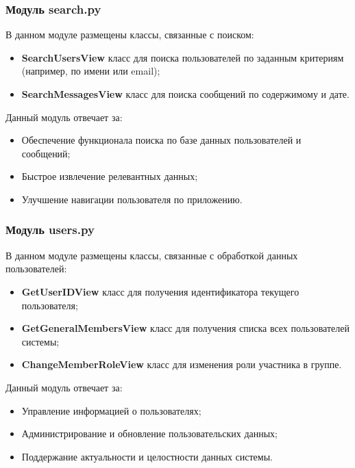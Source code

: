 \subsubsection{Модуль search.py}
В данном модуле размещены классы, связанные с поиском:
\begin{itemize}
	\item \textbf{SearchUsersView} класс для поиска пользователей по заданным критериям (например, по имени или email);
	\item \textbf{SearchMessagesView} класс для поиска сообщений по содержимому и дате.
\end{itemize}
Данный модуль отвечает за:
\begin{itemize}
	\item Обеспечение функционала поиска по базе данных пользователей и сообщений;
	\item Быстрое извлечение релевантных данных;
	\item Улучшение навигации пользователя по приложению.
\end{itemize}

\subsubsection{Модуль users.py}
В данном модуле размещены классы, связанные с обработкой данных пользователей:
\begin{itemize}
	\item \textbf{GetUserIDView} класс для получения идентификатора текущего пользователя;
	\item \textbf{GetGeneralMembersView} класс для получения списка всех пользователей системы;
	\item \textbf{ChangeMemberRoleView} класс для изменения роли участника в группе.
\end{itemize}
Данный модуль отвечает за:
\begin{itemize}
	\item Управление информацией о пользователях;
	\item Администрирование и обновление пользовательских данных;
	\item Поддержание актуальности и целостности данных системы.
\end{itemize}



